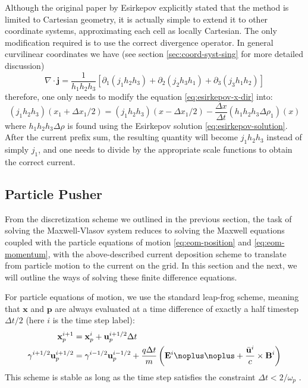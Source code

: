 Although the original paper by Esirkepov explicitly stated that the method is
limited to Cartesian geometry, it is actually simple to extend it to other
coordinate systems, approximating each cell as locally Cartesian. The only
modification required is to use the correct divergence operator. In general
curvilinear coordinates we have (see section \ref{sec:coord-syst-sing} for more
detailed discussion)
\begin{equation}
  \label{eq:curvilinear-div}
  \nabla\cdot \mathbf{j} = \frac{1}{h_1h_2h_3}\left[ \partial_1(j_1h_2h_3) + \partial_2(j_2h_3h_1) + \partial_3(j_3h_1h_2) \right]
\end{equation}
therefore, one only needs to modify the equation \eqref{eq:esirkepov-x-dir}
into:
\begin{equation}
  \label{eq:esirkepov-single-dir}
  (j_1h_2h_3)(x_1 + \Delta x_1/2) = (j_1h_2h_3)(x - \Delta x_1/2) - \frac{\Delta x}{\Delta t}(h_1h_2h_3\Delta \rho_{1})(x)
\end{equation}
where $h_1h_2h_3\Delta \rho$ is found using the Esirkepov solution
\eqref{eq:esirkepov-solution}. After the current prefix sum, the resulting
quantity will become $j_1h_2h_3$ instead of simply $j_{1}$, and one needs to
divide by the appropriate scale functions to obtain the correct current.




\subsection{Particle Pusher}
\label{sec:finite-difference}

From the discretization scheme we outlined in the previous section, the task of
solving the Maxwell-Vlasov system reduces to solving the Maxwell equations
coupled with the particle equations of motion \eqref{eq:eom-position} and
\eqref{eq:eom-momentum}, with the above-described current deposition scheme to
translate from particle motion to the current on the grid. In this section and
the next, we will outline the ways of solving these finite difference equations.

For particle equations of motion, we use the standard leap-frog scheme, meaning
that $\mathbf{x}$ and $\mathbf{p}$ are always evaluated at a time difference of
exactly a half timestep $\Delta t/2$ (here $i$ is the time step label):
\begin{align}
  \label{eq:leap-frog-particle}
    \mathbf{x}_{p}^{i+1} &= \mathbf{x}_{p}^{i} +\mathbf{u}_{p}^{i+1/2} \Delta t \\
    \gamma^{i+1/2} \mathbf{u}_{p}^{i+1/2} &= \gamma^{i-1/2}
    \mathbf{u}_{p}^{i-1/2} + \frac{q \Delta t}{m} \left( \mathbf{E}^{i}
    \noplus \noplus + \frac{\bar{\mathbf{u}}^{i}}{c}
    \times \mathbf{B}^{i} \right)
\end{align}
This scheme is stable as long as the time step satisfies the constraint $\Delta
t < 2/\omega_p$ \citep{tajima_computational_1989}.

